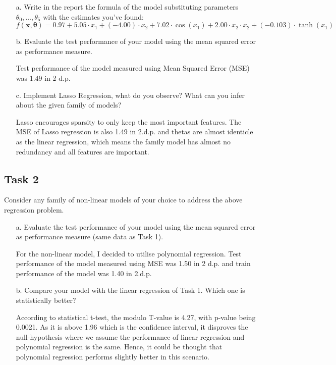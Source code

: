 \documentclass[11pt]{scrartcl}
\begin{document}
\begin{itemize}
	\item [a.] Write in the report the formula of the model substituting parameters $\theta_0, \ldots, \theta_5$ with the estimates you've found:
	$$f(\mathbf{x}, \boldsymbol{\theta}) =  0.97 + 5.05 \cdot x_1 + (-4.00) \cdot x_2 + 7.02 \cdot \cos(x_1) + 2.00 \cdot x_2 \cdot x_2 + (-0.103) \cdot \tanh(x_1)$$

 
    \item [b.] Evaluate the test performance of your model using the mean squared error as performance measure.
    
    Test performance of the model measured using Mean Squared Error (MSE) was 1.49 in 2 d.p. 
    
    \item [c.] Implement Lasso Regression, what do you observe? What can you infer about the given family of models?
    
    Lasso encourages sparsity to only keep the most important features. The MSE of Lasso regression is also 1.49 in 2.d.p. and thetas are almost identicle as the linear regression, which means the family model has almost no redundancy and all features are important.
\end{itemize}


\subsection*{Task 2}
Consider any family of non-linear models of your choice to address the above regression problem.
\begin{itemize}
	\item [a.] Evaluate the test performance of your model using the mean squared error as performance measure (same data as Task 1). 
	
	For the non-linear model, I decided to utilise polynomial regression. Test performance of the model measured using MSE was 1.50 in 2 d.p. and train performance of the model was 1.40 in 2.d.p.
	
	\item [b.] Compare your model with the linear regression of Task 1. Which one is {statistically} better?
	
	According to statistical t-test, the modulo T-value is 4.27, with p-value being 0.0021. As it is above 1.96 which is the confidence interval, it disproves the null-hypothesis where we assume the performance of linear regression and polynomial regression is the same. Hence, it could be thought that polynomial regression performs slightly better in this scenario.
	
\end{itemize}
\end{document}
